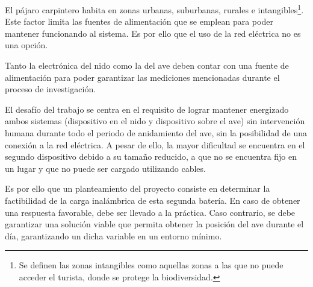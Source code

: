 El pájaro carpintero habita en zonas urbanas, suburbanas, rurales e intangibles\footnote{Se definen las zonas intangibles como aquellas zonas a las que no puede acceder el turista, donde se protege la biodiversidad.}. Este factor limita las fuentes de alimentación que se emplean para poder mantener funcionando al sistema. Es por ello que el uso de la red eléctrica no es una opción.

Tanto la electrónica del nido como la del ave deben contar con una fuente de alimentación para poder garantizar las mediciones mencionadas durante el proceso de investigación.

El desafío del trabajo se centra en el requisito de lograr mantener energizado ambos sistemas (dispositivo en el nido y dispositivo sobre el ave) sin intervención humana durante todo el periodo de anidamiento del ave, sin la posibilidad de una conexión a la red eléctrica. A pesar de ello, la mayor dificultad se encuentra en el segundo dispositivo debido a su tamaño reducido, a que no se encuentra fijo en un lugar y que no puede ser cargado utilizando cables.

Es por ello que un planteamiento del proyecto consiste en determinar la factibilidad de la carga inalámbrica de esta segunda batería. En caso de obtener una respuesta favorable, debe ser llevado a la práctica. Caso contrario, se debe garantizar una solución viable que permita obtener la posición del ave durante el día, garantizando un dicha variable en un entorno mínimo.


